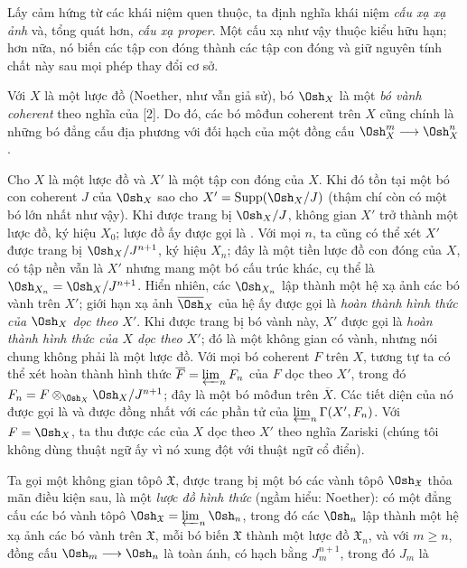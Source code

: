 Lấy cảm hứng từ các khái niệm quen thuộc, ta định nghĩa khái niệm
\emph{cấu xạ xạ ảnh} và, tổng quát hơn, \emph{cấu xạ proper}. Một cấu xạ như
vậy thuộc kiểu hữu hạn; hơn nữa, nó biến các tập con đóng thành các tập con
đóng và giữ nguyên tính chất này sau mọi phép thay đổi cơ sở.

Với $X$ là một lược đồ (Noether, như vẫn giả sử), bó $\Osh_X$ là một
\emph{bó vành coherent} theo nghĩa của [2]. Do đó, các bó môđun coherent trên
$X$ cũng chính là những bó đẳng cấu địa phương với đối hạch của một đồng cấu
$\Osh_X^{m}\longrightarrow\Osh_X^{n}$.


Cho $X$ là một lược đồ và $X'$ là một tập con đóng của $X$. Khi đó tồn tại một
bó con coherent $J$ của $\Osh_X$ sao cho
$X'=\operatorname{Supp}(\Osh_X/J)$ (thậm chí còn có một bó lớn nhất như vậy).
Khi được trang bị $\Osh_X/J$, không gian $X'$ trở thành một lược đồ, ký hiệu
$X_0$; lược đồ ấy được gọi là . Với mọi $n$,
ta cũng có thể xét $X'$ được trang bị $\Osh_X/J^{n+1}$, ký hiệu $X_n$; đây là
một tiền lược đồ con đóng của $X$, có tập nền vẫn là $X'$ nhưng mang một bó
cấu trúc khác, cụ thể là $\Osh_{X_n}=\Osh_X/J^{n+1}$. Hiển nhiên, các
$\Osh_{X_n}$ lập thành một hệ xạ ảnh các bó vành trên $X'$; giới hạn xạ ảnh
$\overline{\Osh}_X$ của hệ ấy được gọi là \emph{hoàn thành hình thức của
$\Osh_X$ dọc theo $X'$}. Khi được trang bị bó vành này, $X'$ được gọi là
\emph{hoàn thành hình thức của $X$ dọc theo $X'$}; đó là một không gian có
vành, nhưng nói chung không phải là một lược đồ. Với mọi bó coherent $F$ trên
$X$, tương tự ta có thể xét hoàn thành hình thức
$\overline F=\varprojlim_n F_n$ của $F$ dọc theo $X'$, trong đó
$F_n=F\otimes_{\Osh_X}\Osh_X/J^{n+1}$; đây là một bó môđun trên
$\overline X$. Các tiết diện của nó được gọi là  và được đồng nhất với các phần tử của
$\varprojlim_n\Gamma(X',F_n)$. Với $F=\Osh_X$, ta thu được các
 của $X$ dọc theo $X'$ theo nghĩa Zariski (chúng tôi
không dùng thuật ngữ ấy vì nó xung đột với thuật ngữ cổ điển).

Ta gọi một không gian tôpô $\mathfrak X$, được trang bị một bó các vành tôpô
$\Osh_{\mathfrak X}$ thỏa mãn điều kiện sau, là một \emph{lược đồ hình thức}
(ngầm hiểu: Noether): có một đẳng cấu các bó vành tôpô
$\Osh_{\mathfrak X}=\varprojlim_n\Osh_n$, trong đó các $\Osh_n$ lập thành một
hệ xạ ảnh các bó vành trên $\mathfrak X$, mỗi bó biến $\mathfrak X$ thành một
lược đồ $\mathfrak X_n$, và với $m\geq n$, đồng cấu
$\Osh_m\longrightarrow\Osh_n$ là toàn ánh, có hạch bằng $J_m^{n+1}$, trong đó
$J_m$ là

